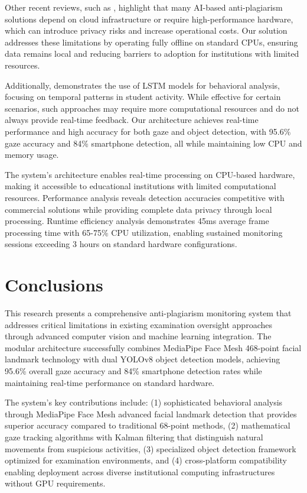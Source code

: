 \documentclass[conference]{IEEEtran}
\begin{document}
Other recent reviews, such as \cite{abbas2022review}, highlight that many AI-based anti-plagiarism solutions depend on cloud infrastructure or require high-performance hardware, which can introduce privacy risks and increase operational costs. Our solution addresses these limitations by operating fully offline on standard CPUs, ensuring data remains local and reducing barriers to adoption for institutions with limited resources.

Additionally, \cite{alsabhan2023} demonstrates the use of LSTM models for behavioral analysis, focusing on temporal patterns in student activity. While effective for certain scenarios, such approaches may require more computational resources and do not always provide real-time feedback. Our architecture achieves real-time performance and high accuracy for both gaze and object detection, with 95.6\% gaze accuracy and 84\% smartphone detection, all while maintaining low CPU and memory usage.

The system's architecture enables real-time processing on CPU-based hardware, making it accessible to educational institutions with limited computational resources. Performance analysis reveals detection accuracies competitive with commercial solutions while providing complete data privacy through local processing. Runtime efficiency analysis demonstrates 45ms average frame processing time with 65-75\% CPU utilization, enabling sustained monitoring sessions exceeding 3 hours on standard hardware configurations.

\section{Conclusions}

This research presents a comprehensive anti-plagiarism monitoring system that addresses 
critical limitations in existing examination oversight approaches through advanced 
computer vision and machine learning integration. The modular architecture successfully 
combines MediaPipe Face Mesh 468-point facial landmark technology with dual YOLOv8 
object detection models, achieving 95.6\% overall gaze accuracy and 84\% smartphone 
detection rates while maintaining real-time performance on standard hardware.

The system's key contributions include: (1) sophisticated behavioral analysis through 
MediaPipe Face Mesh advanced facial landmark detection that provides superior accuracy 
compared to traditional 68-point methods, (2) mathematical gaze tracking algorithms 
with Kalman filtering that distinguish natural movements from suspicious activities, 
(3) specialized object detection framework optimized for examination environments, 
and (4) cross-platform compatibility enabling deployment across diverse institutional 
computing infrastructures without GPU requirements.
\end{document}
